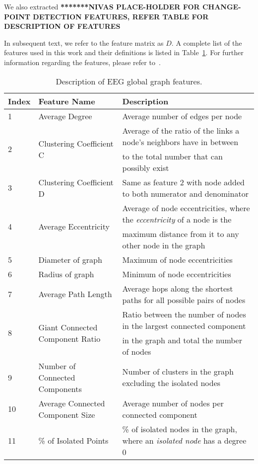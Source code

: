 \documentclass{article} %
\begin{document}
We also extracted \textbf{*******NIVAS PLACE-HOLDER FOR CHANGE-POINT DETECTION FEATURES, REFER TABLE FOR DESCRIPTION OF FEATURES}

In subsequent text, we refer to the feature matrix as $D$.  A complete list of the features used in this work and their definitions is listed in Table~\ref{tab:features}.  For further information regarding the features, please refer to~\cite{bilgin_multiscale}. 

\begin{table}[htb]
\caption{Description of EEG global graph features.}\label{tab:features}
\renewcommand{\arraystretch}{0.8} %

\begin{tabular}{lll}
Index&Feature Name& Description\\
\hline
\hline
1&Average Degree&Average number of edges per node\\
\multirow{2}{*}{2}&\multirow{2}{*}{Clustering Coefficient C} &Average of the ratio of the links a node's neighbors have in between\\
&&to the total number that can possibly exist\\
3&Clustering Coefficient D & Same as feature $2$ with node added to both numerator and denominator\\
\multirow{2}{*}{4}&\multirow{2}{*}{Average Eccentricity} & Average of node eccentricities, where the {\em eccentricity} of a node is the\\
&&maximum distance from it to any other node in the graph\\
5&Diameter of graph& Maximum of node eccentricities\\
6&Radius of graph& Minimum of node eccentricities\\
7&Average Path Length &Average hops along the shortest paths for all possible pairs of nodes\\
\multirow{2}{*}{8}&\multirow{2}{*}{Giant Connected Component Ratio}& Ratio between the number of nodes in the largest connected component\\ && in the graph and total
the number of nodes\\
9&Number of Connected Components&Number of clusters in the graph excluding the isolated nodes\\
10&Average Connected Component Size&Average number of nodes per connected component \\
11&\% of Isolated Points&\% of isolated nodes in the graph, where an {\em isolated node} has a degree 0\\

\end{tabular}
\end{table}
\end{document}
